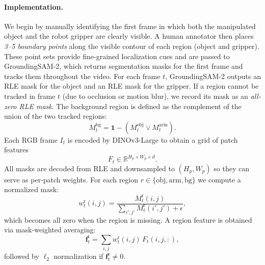 \paragraph{Implementation.}
We begin by manually identifying the first frame in which both the manipulated object and the robot gripper are clearly visible.  
A human annotator then places \textit{3--5 boundary points} along the visible contour of each region (object and gripper).  
These point sets provide fine-grained localization cues and are passed to GroundingSAM-2, which returns segmentation masks for the first frame and tracks them throughout the video. For each frame $t$, GroundingSAM-2 outputs an RLE mask for the object and an RLE mask for the gripper.  
If a region cannot be tracked in frame $t$ (due to occlusion or motion blur), we record its mask as an \textit{all-zero RLE mask}.  The background region is defined as the complement of the union of the two tracked regions:
\[
M^{\mathrm{bg}}_t = \mathbf{1} - \left(M^{\mathrm{obj}}_t \lor M^{\mathrm{arm}}_t\right).
\]
\noindent
Each RGB frame $I_t$ is encoded by DINOv3-Large to obtain a grid of patch features  
\[
F_t \in \mathbb{R}^{H_p \times W_p \times d}.
\]
All masks are decoded from RLE and downsampled to $(H_p, W_p)$ so they can serve as per-patch weights.  
For each region $r \in \{\mathrm{obj},\mathrm{arm},\mathrm{bg}\}$ we compute a normalized mask:
\[
w^\mathrm{r}_t(i,j) = 
\frac{M^\mathrm{r}_t(i,j)}{\sum_{i',j'} M^\mathrm{r}_t(i',j') + \epsilon},
\]
which becomes all zero when the region is missing.
\noindent
A region feature is obtained via mask-weighted averaging:
\[
\mathbf{f}^\mathrm{r}_t = \sum_{i,j} w^\mathrm{r}_t(i,j)\, F_t(i,j,:),
\]
followed by $\ell_2$ normalization if $\mathbf{f}^\mathrm{r}_t \neq 0$.

